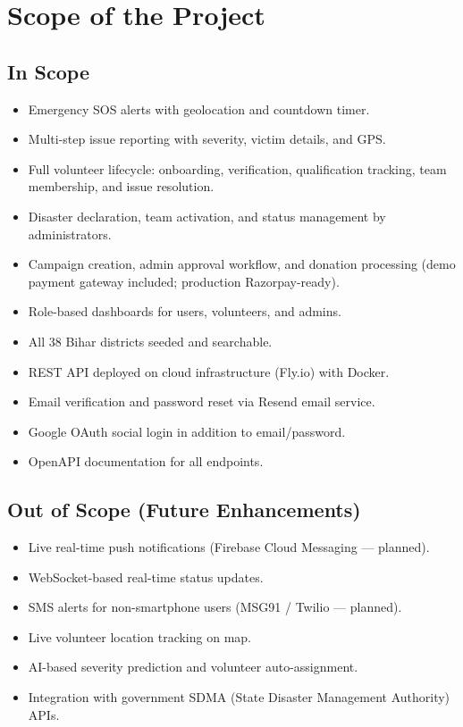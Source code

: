 \documentclass[12pt,a4paper]{article}
\begin{document}
\section{Scope of the Project}

\subsection{In Scope}

\begin{itemize}[leftmargin=*, itemsep=3pt]
  \item Emergency SOS alerts with geolocation and countdown timer.
  \item Multi-step issue reporting with severity, victim details, and GPS.
  \item Full volunteer lifecycle: onboarding, verification, qualification
        tracking, team membership, and issue resolution.
  \item Disaster declaration, team activation, and status management by
        administrators.
  \item Campaign creation, admin approval workflow, and donation processing
        (demo payment gateway included; production Razorpay-ready).
  \item Role-based dashboards for users, volunteers, and admins.
  \item All 38 Bihar districts seeded and searchable.
  \item REST API deployed on cloud infrastructure (Fly.io) with Docker.
  \item Email verification and password reset via Resend email service.
  \item Google OAuth social login in addition to email/password.
  \item OpenAPI documentation for all endpoints.
\end{itemize}

\subsection{Out of Scope (Future Enhancements)}

\begin{itemize}[leftmargin=*, itemsep=3pt]
  \item Live real-time push notifications (Firebase Cloud Messaging --- planned).
  \item WebSocket-based real-time status updates.
  \item SMS alerts for non-smartphone users (MSG91 / Twilio --- planned).
  \item Live volunteer location tracking on map.
  \item AI-based severity prediction and volunteer auto-assignment.
  \item Integration with government SDMA (State Disaster Management Authority) APIs.
\end{itemize}
\end{document}
